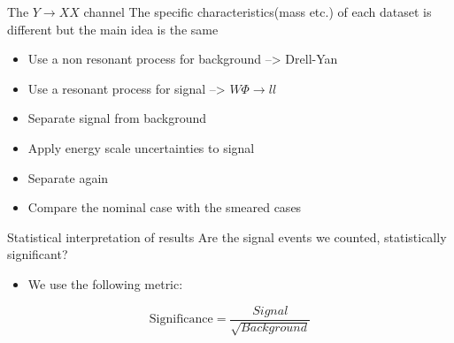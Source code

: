 \documentclass[bigger]{beamer}
\begin{document}
\begin{frame}[label={sec:orgdf3e6a1}]{The \(Y \rightarrow XX\) channel}
The specific characteristics(mass etc.) of each dataset  is different but the main idea is the same
\begin{itemize}
\item Use a non resonant process for background --> Drell-Yan
\item Use a resonant process for signal --> \(W\Phi \rightarrow ll\)
\item Separate signal from background
\item Apply energy scale uncertainties to signal
\item Separate again
\item Compare the nominal case with the smeared cases
\end{itemize}
\end{frame}
\begin{frame}[label={sec:org0abbd8c}]{Statistical interpretation of results}
\alert{Are the signal events we counted, statistically significant?}
\begin{itemize}
\item We use the following metric:
\end{itemize}
\begin{equation}
\text{Significance} = \frac{Signal}{\sqrt{Background}}
\end{equation}
\end{frame}
\end{document}
